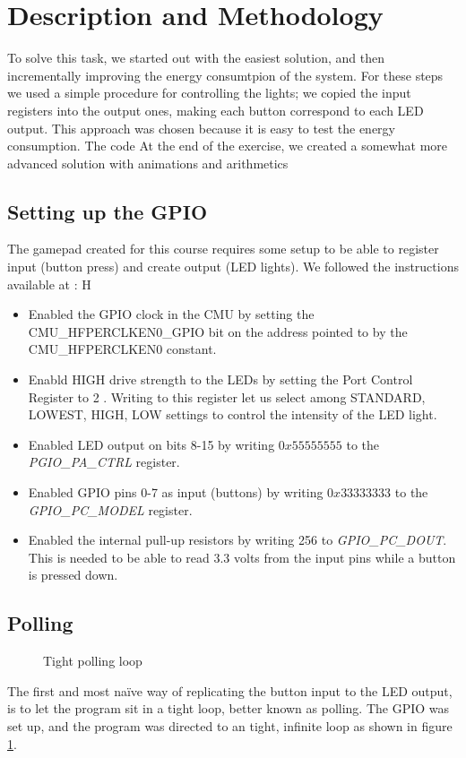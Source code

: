 \section{Description and Methodology}
\label{section:description_and_methodology}
To solve this task, we started out with the easiest solution, and then incrementally improving the energy consumtpion of the system. For these steps we used a simple procedure for controlling the lights; we copied the input registers into the output ones, making each button correspond to each LED output. This approach was chosen because it is easy to test the energy consumption. The code 
At the end of the exercise, we created a somewhat more advanced solution with animations and arithmetics

	\subsection{Setting up the GPIO}
	\label{subsection:gpio_setup}
	The gamepad created for this course requires some setup to be able to register input (button press) and create output (LED lights). We followed the instructions available at \cite[p. 24]{compendium}:
H
	\begin{itemize}
		\item Enabled the GPIO clock in the CMU by setting the CMU\_HFPERCLKEN0\_GPIO bit on the address pointed to by the CMU\_HFPERCLKEN0 constant.
		\item Enabld HIGH drive strength to the LEDs by setting the Port Control Register to 2 \cite[p. 766]{reference_manual}. Writing to this register let us select among STANDARD, LOWEST, HIGH, LOW settings to control the intensity of the LED light.
		\item Enabled LED output on bits 8-15 by writing $0x55555555$ to the \emph{PGIO\_PA\_CTRL} register.
		\item Enabled GPIO pins 0-7 as input (buttons) by writing $0x33333333$ to the \emph{GPIO\_PC\_MODEL} register.
		\item Enabled the internal pull-up resistors by writing 256 to \emph{GPIO\_PC\_DOUT}. This is needed to be able to read 3.3 volts from the input pins while a button is pressed down.
	\end{itemize}

	\subsection{Polling}
	\label{subsection:polling}
	\begin{figure}[h]
		
		\caption{Tight polling loop}
		\label{code:polling_loop}
	\end{figure}
	The first and most naïve way of replicating the button input to the LED output, is to let the program sit in a tight loop, better known as polling. The GPIO was set up, and the program was directed to an tight, infinite loop as shown in figure \ref{code:polling_loop}.


